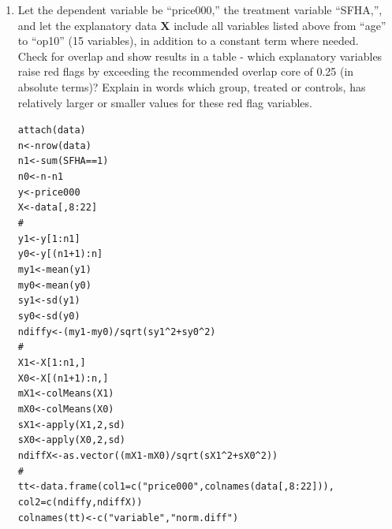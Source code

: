 \documentclass[11pt,reqno]{amsart}\usepackage[]{graphicx}\usepackage[]{color}
\makeatletter
\newcommand{\hlnum}[1]{\textcolor[rgb]{0.063,0.58,0.627}{#1}}%
\newcommand{\hlstr}[1]{\textcolor[rgb]{0.063,0.58,0.627}{#1}}%
\newcommand{\hlcom}[1]{\textcolor[rgb]{0.588,0.588,0.588}{#1}}%
\newcommand{\hlopt}[1]{\textcolor[rgb]{0.196,0.196,0.196}{#1}}%
\newcommand{\hlstd}[1]{\textcolor[rgb]{0.196,0.196,0.196}{#1}}%
\newcommand{\hlkwb}[1]{\textcolor[rgb]{0.627,0,0.314}{#1}}%
\newcommand{\hlkwc}[1]{\textcolor[rgb]{0,0.631,0.314}{#1}}%
\newcommand{\hlkwd}[1]{\textcolor[rgb]{0.78,0.227,0.412}{#1}}%
\newenvironment{kframe}{%
 \def\at@end@of@kframe{}%
 \ifinner\ifhmode%
  \def\at@end@of@kframe{\end{minipage}}%
  \begin{minipage}{\columnwidth}%
 \fi\fi%
 \def\FrameCommand##1{\hskip\@totalleftmargin \hskip-\fboxsep
 \colorbox{shadecolor}{##1}\hskip-\fboxsep
     \hskip-\linewidth \hskip-\@totalleftmargin \hskip\columnwidth}%
 \MakeFramed {\advance\hsize-\width
   \@totalleftmargin\z@ \linewidth\hsize
   \@setminipage}}%
 {\par\unskip\endMakeFramed%
 \at@end@of@kframe}
\newcommand{\mlt}[1]{\mathbf{#1}} %
\newcommand{\kX}{\mlt{X}}
\makeatother
\begin{document}
\begin{enumerate}
\item 
Let the dependent variable be ``price000,'' the treatment variable ``SFHA,'', and let the explanatory data $\kX$ include all variables listed above from ``age'' to ``op10'' (15 variables), in addition to a constant term where needed.\\

Check for overlap and show results in a table - which explanatory variables raise red flags by exceeding the recommended overlap core of 0.25 (in absolute terms)? Explain in words which group, treated or controls, has relatively larger or smaller values for these red flag variables.\\

\begin{kframe}
\begin{alltt}
\hlkwd{attach}\hlstd{(data)}
\hlstd{n} \hlkwb{<-} \hlkwd{nrow}\hlstd{(data)}
\hlstd{n1} \hlkwb{<-} \hlkwd{sum}\hlstd{(SFHA} \hlopt{==} \hlnum{1}\hlstd{)}
\hlstd{n0} \hlkwb{<-} \hlstd{n} \hlopt{-} \hlstd{n1}
\hlstd{y} \hlkwb{<-} \hlstd{price000}
\hlstd{X} \hlkwb{<-} \hlstd{data[,} \hlnum{8}\hlopt{:}\hlnum{22}\hlstd{]}
\hlcom{#}
\hlstd{y1} \hlkwb{<-} \hlstd{y[}\hlnum{1}\hlopt{:}\hlstd{n1]}
\hlstd{y0} \hlkwb{<-} \hlstd{y[(n1} \hlopt{+} \hlnum{1}\hlstd{)}\hlopt{:}\hlstd{n]}
\hlstd{my1} \hlkwb{<-} \hlkwd{mean}\hlstd{(y1)}
\hlstd{my0} \hlkwb{<-} \hlkwd{mean}\hlstd{(y0)}
\hlstd{sy1} \hlkwb{<-} \hlkwd{sd}\hlstd{(y1)}
\hlstd{sy0} \hlkwb{<-} \hlkwd{sd}\hlstd{(y0)}
\hlstd{ndiffy} \hlkwb{<-} \hlstd{(my1} \hlopt{-} \hlstd{my0)} \hlopt{/} \hlkwd{sqrt}\hlstd{(sy1} \hlopt{^} \hlnum{2} \hlopt{+} \hlstd{sy0} \hlopt{^} \hlnum{2}\hlstd{)}
\hlcom{#}
\hlstd{X1} \hlkwb{<-} \hlstd{X[}\hlnum{1}\hlopt{:}\hlstd{n1, ]}
\hlstd{X0} \hlkwb{<-} \hlstd{X[(n1} \hlopt{+} \hlnum{1}\hlstd{)}\hlopt{:}\hlstd{n, ]}
\hlstd{mX1} \hlkwb{<-} \hlkwd{colMeans}\hlstd{(X1)}
\hlstd{mX0} \hlkwb{<-} \hlkwd{colMeans}\hlstd{(X0)}
\hlstd{sX1} \hlkwb{<-} \hlkwd{apply}\hlstd{(X1,} \hlnum{2}\hlstd{, sd)}
\hlstd{sX0} \hlkwb{<-} \hlkwd{apply}\hlstd{(X0,} \hlnum{2}\hlstd{, sd)}
\hlstd{ndiffX} \hlkwb{<-} \hlkwd{as.vector}\hlstd{((mX1} \hlopt{-} \hlstd{mX0)} \hlopt{/} \hlkwd{sqrt}\hlstd{(sX1} \hlopt{^} \hlnum{2} \hlopt{+} \hlstd{sX0} \hlopt{^} \hlnum{2}\hlstd{))}
\hlcom{#}
\hlstd{tt} \hlkwb{<-} \hlkwd{data.frame}\hlstd{(}\hlkwc{col1} \hlstd{=} \hlkwd{c}\hlstd{(}\hlstr{"price000"}\hlstd{,} \hlkwd{colnames}\hlstd{(data[,} \hlnum{8}\hlopt{:}\hlnum{22}\hlstd{])),}
                 \hlkwc{col2} \hlstd{=} \hlkwd{c}\hlstd{(ndiffy, ndiffX))}
\hlkwd{colnames}\hlstd{(tt)} \hlkwb{<-} \hlkwd{c}\hlstd{(}\hlstr{"variable"}\hlstd{,} \hlstr{"norm.diff"}\hlstd{)}
\end{alltt}
\end{kframe}


\end{enumerate}
\end{document}
